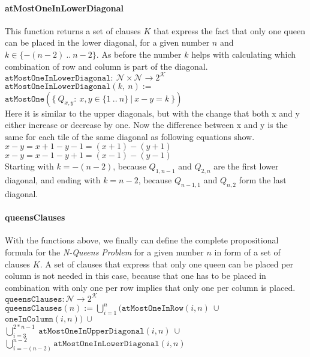 \paragraph{atMostOneInLowerDiagonal}
This function returns a set of clauses $K$ that express the fact that only one queen can be placed in the lower diagonal, for a given number $n$ and $k \in \{-(n - 2)\ ..\ n - 2\}$. As before the number $k$ helps with calculating which combination of row and column is part of the diagonal.
\\[0.2cm]
\hspace*{1.3cm} $\texttt{atMostOneInLowerDiagonal}:\ \mathcal{N} \times \mathcal{N} \to 2^{\mathcal{K}}$
\\[0.2cm]
\hspace*{1.3cm} $\texttt{atMostOneInLowerDiagonal}(k,\ n) :=$
\\
\hspace*{2.6cm} $\texttt{atMostOne}(\{\ Q_{x,y} :\ x,y \in \{1\ ..\ n\}\ |\ x - y = k\ \})$
\\[0.2cm]
Here it is similar to the upper diagonals, but with the change that both x and y either increase or decrease by one. Now the difference between x and y is the same for each tile of the same diagonal as following equations show.
\\[0.2cm]
\hspace*{1.3cm} $x - y = x + 1 - y - 1 = (x + 1) - (y + 1)$\\
\hspace*{1.3cm} $x - y = x - 1 - y + 1 = (x - 1) - (y - 1)$
\\[0.2cm]
Starting with $k = -(n - 2)$, because $Q_{1,n - 1}$ and $Q_{2,n}$ are the first lower diagonal, and ending with $k = n - 2$, because $Q_{n - 1, 1}$ and $Q_{n, 2}$ form the last diagonal.

\paragraph{queensClauses}
With the functions above, we finally can define the complete propositional formula for the \textit{N-Queens Problem} for a given number $n$ in form of a set of clauses $K$. A set of clauses that express that only one queen can be placed per column is not needed in this case, because that one has to be placed in combination with only one per row implies that only one per column is placed.
\\[0.2cm]
\hspace*{1.3cm} $\texttt{queensClauses}: \mathcal{N} \to 2^{\mathcal{K}}$
\\[0.2cm]
\hspace*{1.3cm} $\texttt{queensClauses}(n) := \bigcup\limits_{i=1}^{n}(\texttt{atMostOneInRow}(i, n)\ \cup\ $
$\texttt{oneInColumn}(i, n))\ \cup\ $
\\[0.1cm]
\hspace*{6.1cm} $\bigcup\limits_{i=3}^{2 * n - 1}\ \texttt{atMostOneInUpperDiagonal}(i, n)\ \cup\ $
\\[0.1cm]
\hspace*{5.8cm} $\bigcup\limits_{i=-(n - 2)}^{n - 2}\texttt{atMostOneInLowerDiagonal}(i, n)$